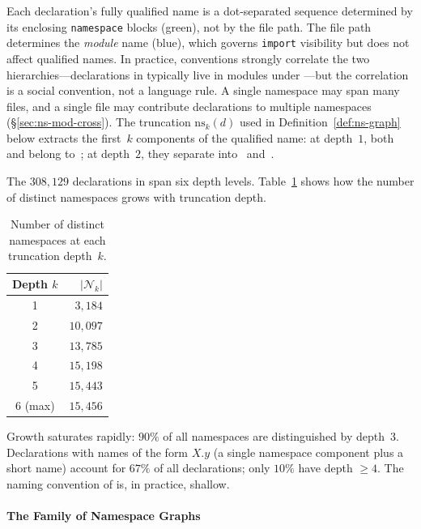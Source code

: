 \noindent
Each declaration's fully qualified name is a dot-separated sequence determined by its enclosing \texttt{namespace} blocks (\textcolor{green!50!black}{green}), not by the file path. The file path determines the \emph{module} name (\textcolor{blue!60!black}{blue}), which governs \texttt{import} visibility but does not affect qualified names. In practice,  conventions strongly correlate the two hierarchies---declarations in  typically live in modules under ---but the correlation is a social convention, not a language rule. A single namespace may span many files, and a single file may contribute declarations to multiple namespaces (\S\ref{sec:ns-mod-cross}). The truncation $\mathrm{ns}_k(d)$ used in Definition~\ref{def:ns-graph} below extracts the first~$k$ components of the qualified name: at depth~$1$, both  and  belong to~; at depth~$2$, they separate into~ and~.

The $308{,}129$ declarations in  span six depth levels. Table~\ref{tab:ns-depth-count} shows how the number of distinct namespaces grows with truncation depth.

\begin{table}[ht]
\centering
\caption{Number of distinct namespaces at each truncation depth~$k$.}
\label{tab:ns-depth-count}
\begin{tabular}{cr}
\toprule
Depth $k$ & $|\mathcal{N}_k|$ \\
\midrule
1          & $3{,}184$ \\
2          & $10{,}097$ \\
3          & $13{,}785$ \\
4          & $15{,}198$ \\
5          & $15{,}443$ \\
6 (max)    & $15{,}456$ \\
\bottomrule
\end{tabular}
\end{table}

Growth saturates rapidly: $90\%$ of all namespaces are distinguished by depth~$3$. Declarations with names of the form $X.y$ (a single namespace component plus a short name) account for $67\%$ of all declarations; only $10\%$ have depth $\ge 4$. The naming convention of  is, in practice, shallow.

\paragraph{The Family of Namespace Graphs}
\label{sec:ns-definition}

